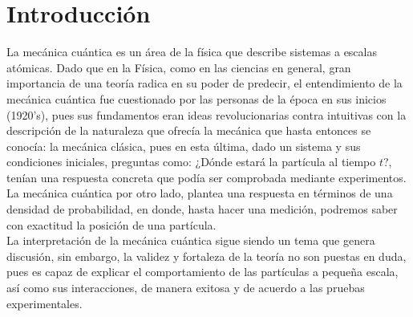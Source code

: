 \chapter{Introducción}\label{ch:introduccion}

La mecánica cuántica es un área de la física que describe sistemas a escalas atómicas. Dado que en la Física, como en las ciencias en general, gran importancia de una teoría radica en su poder de predecir, el entendimiento de la mecánica cuántica fue cuestionado por las personas de la época en sus inicios (1920's), pues sus fundamentos eran ideas revolucionarias contra intuitivas con la descripción de la naturaleza que ofrecía la mecánica que hasta entonces se conocía: la mecánica clásica, pues en esta última, dado un sistema y sus condiciones iniciales, preguntas como: ¿Dónde estará la partícula al tiempo $t$?, tenían una respuesta concreta que podía ser comprobada mediante experimentos. La mecánica cuántica por otro lado, plantea una respuesta en términos de una densidad de probabilidad, en donde, hasta hacer una medición, podremos saber con exactitud la posición de una partícula.
\\
La interpretación de la mecánica cuántica sigue siendo un tema que genera discusión, sin embargo, la validez y fortaleza de la teoría no son puestas en duda, pues es capaz de explicar el comportamiento de las partículas a pequeña escala, así como sus interacciones, de manera exitosa y de acuerdo a las pruebas experimentales.
\\

